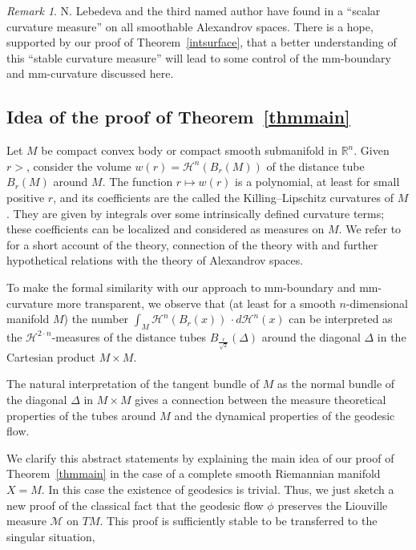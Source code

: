 \documentclass[12pt,leqno,intlimits]{amsart}
\numberwithin{equation}{section}
\theoremstyle{definition}
\theoremstyle{remark}
\newtheorem{rem}[thm]{Remark}
\newcommand{\tref}[1]{Theorem~\ref{#1}}
\newcommand{\R}{\mathbb{R}}
\begin{document}
\begin{rem}
N. Lebedeva and the third named author have found in \cite{LP} a ``scalar curvature measure'' on all smoothable Alexandrov spaces.
There is a hope, supported by our proof of \tref{intsurface}, that a better understanding of this ``stable curvature measure'' will
lead to some control of the mm-boundary and mm-curvature discussed here. 
\end{rem}

\subsection{Idea of the proof of \tref{thmmain}}
Let $M$ be compact convex body or compact smooth submanifold in $\R^n$. 
Given $r>$, consider the volume $w(r)=\mathcal H^n (B_r(M))$ of the distance tube $B_r(M)$ around $M$. 
The function $r\mapsto w(r)$ is a polynomial, at least for small positive $r$, and its coefficients are the called the Killing--Lipschitz curvatures of $M$.
They are given by integrals over some intrinsically defined curvature terms; 
these coefficients can be localized and considered as measures on $M$.
We refer to \cite{Alesker} for a short account of the theory, connection of the theory with 
\cite{LP} and further hypothetical relations with the theory of Alexandrov spaces. 

To make the formal similarity with our approach to mm-boundary and mm-curvature more transparent, we observe that
(at least for a smooth $n$-dimensional manifold $M$) the number $\int _M \mathcal H^n (B_r(x))\, \cdot d\mathcal H^n (x)$ can be interpreted as the $\mathcal H^{2\cdot n}$-measures
of the distance tubes $B_{\frac r {\sqrt 2} } (\Delta )$ around the diagonal $\Delta $ in the Cartesian product $M\times M$.

The natural interpretation of the tangent bundle of $M$ as the normal bundle of the diagonal $\Delta$ in $M\times M$ gives a connection between
the measure theoretical properties of the tubes around $M$ and the dynamical properties of the geodesic flow.

We clarify this abstract statements by explaining the main idea of our proof of \tref{thmmain} in the case of a complete smooth Riemannian manifold $X=M$.
In this case the existence of geodesics is trivial.
Thus, we just sketch a new proof of the classical fact that the geodesic flow $\phi$ preserves the Liouville measure $\mathcal M$ on $TM$.
This proof is sufficiently stable to be transferred to the singular situation,
\end{document}
